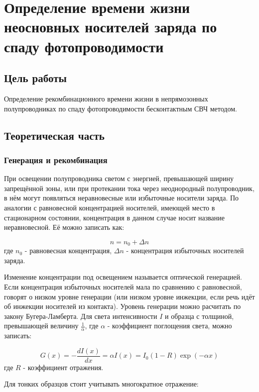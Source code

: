 \chapter{Определение времени жизни неосновных носителей заряда по спаду фотопроводимости}

\section{Цель работы}
Определение рекомбинационного времени жизни в непрямозонных полупроводниках по спаду фотопроводимости бесконтактным СВЧ методом.

\section{Теоретическая часть}

\subsection{Генерация и рекомбинация}
При освещении полупроводника светом с энергией, превышающей ширину запрещённой зоны, или при протекании тока через неоднородный полупроводник, в нём могут появляться неравновесные или избыточные носители заряда. По аналогии с равновесной концентрацией носителей, имеющей место в стационарном состоянии, концентрация в данном случае носит название неравновесной. Её можно записать как:

\begin{equation}
n = n_{0} + \Delta n
\end{equation}
где $n_{0}$ - равновесная концентрация, $\Delta n$ - концентрация избыточных носителей заряда.

Изменение концентрации под освещением называется оптической генерацией. Если концентрация избыточных носителей мала по сравнению с равновесной, говорят о низком уровне генерации (или низком уровне инжекции, если речь идёт об инжекции носителей из контакта). Уровень генерации можно расчитать по закону Бугера-Ламберта. Для света интенсивности $I$ и образца с толщиной, превышающей величину $\frac{1}{\alpha}$, где $\alpha$ - коэффициент поглощения света, можно записать:

\begin{equation}
G(x) = -\frac{d I(x)}{d x} = \alpha I(x) = I_{0} (1-R) \exp(-\alpha x)
\end{equation}
где $R$ - коэффициент отражения.

Для тонких образцов стоит учитывать многократное отражение:

